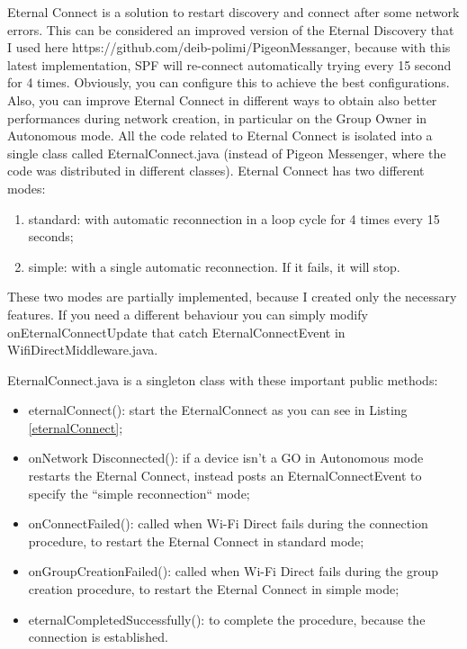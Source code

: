 Eternal Connect is a solution to restart discovery and connect after some network errors. This can be considered an improved version of the Eternal Discovery that I used here https://github.com/deib-polimi/PigeonMessanger, because with this latest implementation, SPF will re-connect automatically trying every 15 second for 4 times. Obviously, you can configure this to achieve the best configurations. Also, you can improve Eternal Connect in different ways to obtain also better performances during network creation, in particular on the Group Owner in Autonomous mode.
All the code related to Eternal Connect is isolated into a single class called EternalConnect.java (instead of Pigeon Messenger, where the code was distributed in different classes).
Eternal Connect has two different modes:
\begin{enumerate}
	\item standard: with automatic reconnection in a loop cycle for 4 times every 15 seconds;
	\item simple: with a single automatic reconnection. If it fails, it will stop.
\end{enumerate}
These two modes are partially implemented, because I created only the necessary features. If you need a different behaviour you can simply modify \textsf{onEternalConnectUpdate} that catch EternalConnectEvent in WifiDirectMiddleware.java.

EternalConnect.java is a singleton class with these important public methods:
\begin{itemize}
	\item eternalConnect(): start the EternalConnect as you can see in Listing 	\ref{eternalConnect};
	\item onNetwork Disconnected(): if a device isn't a GO in Autonomous mode restarts the Eternal Connect, instead posts an EternalConnectEvent to specify the ``simple reconnection`` mode;
	\item onConnectFailed(): called when Wi-Fi Direct fails during the connection procedure, to restart the Eternal Connect in standard mode;
	\item onGroupCreationFailed(): called when Wi-Fi Direct fails during the group creation procedure, to restart the Eternal Connect in simple mode;
	\item eternalCompletedSuccessfully(): to complete the procedure, because the connection is established.
\end{itemize}


